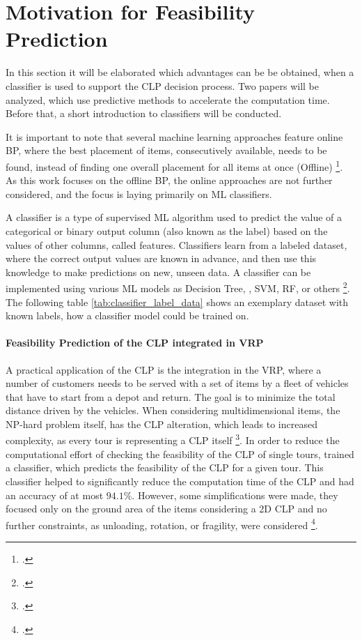 \chapter{Motivation for Feasibility Prediction}
\label{sec:motivation_feasibility_prediction}
In this section it will be elaborated which advantages can be be obtained, when
a classifier is used to support the \gls{CLP} decision process. Two papers will be
analyzed, which use predictive methods to accelerate the computation time. Before that,
a short introduction to classifiers will be conducted.

It is important to note that several machine learning approaches feature
online \gls{BP}, where the best placement of items, consecutively available, needs
to be found, instead of finding one overall placement for all items at once
(Offline) \footcite[cf.][p. 1]{ali_-line_2022}. As this work focuses on the offline
\gls{BP}, the online approaches are not further considered, and the focus is laying
primarily on \gls{ML} classifiers.

A classifier is a type of supervised \gls{ML} algorithm used to predict the
value of a categorical or binary output column (also known as the label) based on the
values of other columns, called features. Classifiers learn from a labeled dataset,
where the correct output values are known in advance, and then use this knowledge to
make predictions on new, unseen data. A classifier can be implemented using various
\gls{ML} models as Decision Tree, , \gls{SVM}, \gls{RF}, or others \footcite[cf.][]{kotsiantis_supervised_2007}.
The following table \ref{tab:classifier_label_data} shows an exemplary dataset with known labels,
how a classifier model could be trained on.







\subsubsection{Feasibility Prediction of the \gls{CLP} integrated in \gls{VRP}}
A practical application of the \gls{CLP} is the integration in the \gls{VRP}, where
a number of customers needs to be served with a set of items by a fleet of vehicles that have
to start from a depot and return. The goal is to minimize the total distance driven
by the vehicles. When considering multidimensional items, the NP-hard problem itself,
has the \gls{CLP} alteration, which leads to increased complexity, as every tour is representing
a \gls{CLP} itself \footcite[cf.][pp.1--2]{tamke_branch-and-cut_2024}.
In order to reduce the computational effort of checking the feasibility of the \gls{CLP}
of single tours, \citeauthor{zhang_learning-based_2022} trained a classifier, which predicts
the feasibility of the \gls{CLP} for a given tour. This classifier helped to significantly
reduce the computation time of the \gls{CLP} and had an accuracy of at most $94.1\%$.
However, some simplifications were made, they focused only on the ground area of the items
considering a \gls{2D} \gls{CLP} and no further constraints, as unloading, rotation,
or fragility, were considered \footcite[cf.][pp. 4, 14]{zhang_learning-based_2022}.

